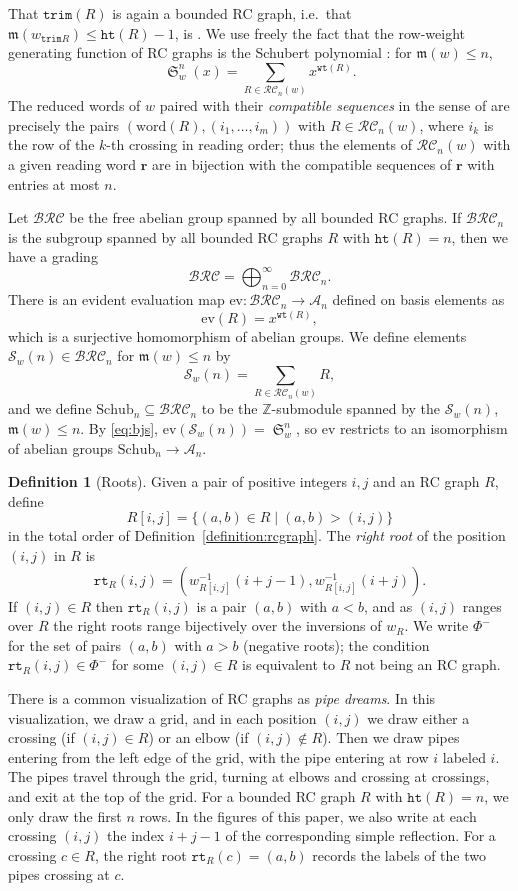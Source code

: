 \documentclass{amsart}
\theoremstyle{definition}
\newtheorem{definition}[lemma]{Definition}
\theoremstyle{remark}
\numberwithin{equation}{subsection}
\DeclareMathOperator{\sch}{\mathfrak{S}}
\newcommand{\wof}[1]{w_{#1}}
\newcommand{\wtt}{\mathtt{wt}}
\newcommand{\rtt}{\mathtt{rt}}
\newcommand{\trm}{\mathtt{trim}}
\newcommand{\hr}{\mathtt{ht}}
\newcommand{\BRC}{\mathcal{BRC}}
\newcommand{\RC}{\mathcal{RC}}
\newcommand{\coma}{\mathcal{A}}
\newcommand{\maxd}{\mathfrak{m}}
\begin{document}
That $\trm(R)$ is again a bounded RC graph, i.e.\ that $\maxd(\wof{\trm R})\leq\hr(R)-1$, is \cite[Lemma~\ref*{B-L:trim}]{samuelbialgebra}. We use freely the fact that the row-weight generating function of RC graphs is the Schubert polynomial \cite{bjs,fominstan}: for $\maxd(w)\leq n$,
\begin{equation}\label{eq:bjs}
\sch_w^n(x) = \sum_{R\in\RC_n(w)} x^{\wtt(R)}.
\end{equation}
The reduced words of $w$ paired with their \emph{compatible sequences} in the sense of \cite{bjs} are precisely the pairs $(\mathrm{word}(R),(i_1,\ldots,i_m))$ with $R\in\RC_n(w)$, where $i_k$ is the row of the $k$-th crossing in reading order; thus the elements of $\RC_n(w)$ with a given reading word $\mathbf r$ are in bijection with the compatible sequences of $\mathbf r$ with entries at most $n$.

Let $\BRC$ be the free abelian group spanned by all bounded RC graphs. If $\BRC_n$ is the subgroup spanned by all bounded RC graphs $R$ with $\hr(R)=n$, then we have a grading
$$\BRC = \bigoplus_{n=0}^\infty \BRC_n.$$
There is an evident evaluation map $\mathrm{ev}: \BRC_n\to \coma_n$ defined on basis elements as
$$\mathrm{ev}(R) = x^{\wtt(R)},$$
which is a surjective homomorphism of abelian groups. We define elements $\mathcal{S}_w(n)\in\BRC_n$ for $\maxd(w)\leq n$ by
$$\mathcal{S}_w(n) = \sum_{R\in\RC_n(w)}R,$$
and we define $\mathrm{Schub}_n\subseteq\BRC_n$ to be the $\mathbb{Z}$-submodule spanned by the $\mathcal{S}_w(n)$, $\maxd(w)\leq n$. By \eqref{eq:bjs}, $\mathrm{ev}(\mathcal{S}_w(n))=\sch_w^n$, so $\mathrm{ev}$ restricts to an isomorphism of abelian groups $\mathrm{Schub}_n\to\coma_n$.

\begin{definition}[Roots]\label{definition:roots}
Given a pair of positive integers $i,j$ and an RC graph $R$, define 
$$R[i, j]=\{(a, b)\in R\mid (a, b) > (i, j)\}$$
in the total order of Definition~\ref{definition:rcgraph}. The \emph{right root} of the position $(i,j)$ in $R$ is
$$\rtt_R(i,j)=(\wof{R[i, j]}^{-1}(i + j - 1), \wof{R[i,j]}^{-1}(i+j)).$$
If $(i,j)\in R$ then $\rtt_R(i,j)$ is a pair $(a,b)$ with $a<b$, and as $(i,j)$ ranges over $R$ the right roots range bijectively over the inversions of $\wof{R}$. We write $\Phi^-$ for the set of pairs $(a,b)$ with $a>b$ (negative roots); the condition $\rtt_R(i,j)\in\Phi^-$ for some $(i,j)\in R$ is equivalent to $R$ not being an RC graph.
\end{definition}

There is a common visualization of RC graphs as \emph{pipe dreams}. In this visualization, we draw a grid, and in each position $(i,j)$ we draw either a crossing (if $(i,j)\in R$) or an elbow (if $(i,j)\notin R$). Then we draw pipes entering from the left edge of the grid, with the pipe entering at row $i$ labeled $i$. The pipes travel through the grid, turning at elbows and crossing at crossings, and exit at the top of the grid. For a bounded RC graph $R$ with $\hr(R)=n$, we only draw the first $n$ rows. In the figures of this paper, we also write at each crossing $(i,j)$ the index $i+j-1$ of the corresponding simple reflection. For a crossing $c\in R$, the right root $\rtt_R(c)=(a,b)$ records the labels of the two pipes crossing at $c$.
\end{document}
